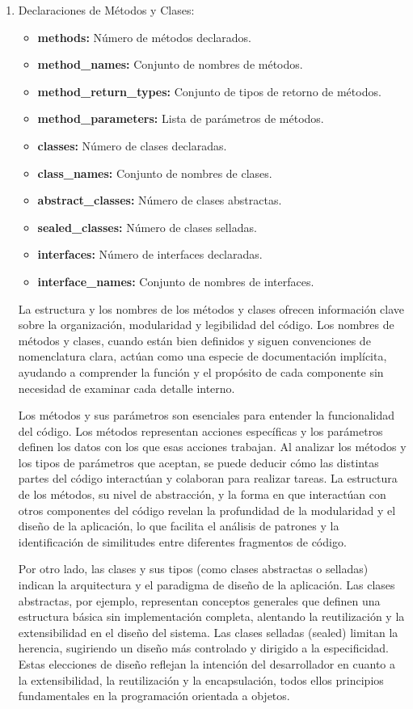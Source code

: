 \begin{enumerate}
    \item Declaraciones de Métodos y Clases:
    \begin{itemize}
        \item {\bf methods:} Número de métodos declarados.
        \item {\bf method\_names:} Conjunto de nombres de métodos.
        \item {\bf method\_return\_types:} Conjunto de tipos de retorno de métodos.
        \item {\bf method\_parameters:} Lista de parámetros de métodos.
        \item {\bf classes:} Número de clases declaradas.
        \item {\bf class\_names:} Conjunto de nombres de clases.
        \item {\bf abstract\_classes:} Número de clases abstractas.
        \item {\bf sealed\_classes:} Número de clases selladas.
        \item {\bf interfaces:} Número de interfaces declaradas.
        \item {\bf interface\_names:} Conjunto de nombres de interfaces.
    \end{itemize}
    
    La estructura y los nombres de los métodos y clases ofrecen información clave sobre la organización, modularidad y legibilidad del código. Los nombres de métodos y clases, cuando están bien definidos y siguen convenciones de nomenclatura clara, actúan como una especie de documentación implícita, ayudando a comprender la función y el propósito de cada componente sin necesidad de examinar cada detalle interno. 

Los métodos y sus parámetros son esenciales para entender la funcionalidad del código. Los métodos representan acciones específicas y los parámetros definen los datos con los que esas acciones trabajan. Al analizar los métodos y los tipos de parámetros que aceptan, se puede deducir cómo las distintas partes del código interactúan y colaboran para realizar tareas. La estructura de los métodos, su nivel de abstracción, y la forma en que interactúan con otros componentes del código revelan la profundidad de la modularidad y el diseño de la aplicación, lo que facilita el análisis de patrones y la identificación de similitudes entre diferentes fragmentos de código.

Por otro lado, las clases y sus tipos (como clases abstractas o selladas) indican la arquitectura y el paradigma de diseño de la aplicación. Las clases abstractas, por ejemplo, representan conceptos generales que definen una estructura básica sin implementación completa, alentando la reutilización y la extensibilidad en el diseño del sistema. Las clases selladas (sealed) limitan la herencia, sugiriendo un diseño más controlado y dirigido a la especificidad. Estas elecciones de diseño reflejan la intención del desarrollador en cuanto a la extensibilidad, la reutilización y la encapsulación, todos ellos principios fundamentales en la programación orientada a objetos.


\end{enumerate}
